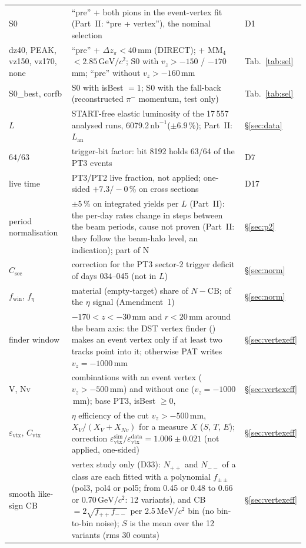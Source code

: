 \documentclass[11pt,a4paper]{article}
\newcommand{\pim}{\ensuremath{\pi^{-}}\xspace}
\newcommand{\nbinv}{\ensuremath{\mathrm{nb}^{-1}}\xspace}
\newcommand{\GeVcc}{\ensuremath{\mathrm{GeV}/c^{2}}\xspace}
\newcommand{\MeVcc}{\ensuremath{\mathrm{MeV}/c^{2}}\xspace}
\newcommand{\code}[1]{\texttt{\detokenize{#1}}}
\newcommand{\MMfour}{\ensuremath{\mathrm{MM}_4}\xspace}
\newcommand{\dzpi}{\ensuremath{\Delta z_\pi}\xspace}
\newcommand{\vz}{\ensuremath{v_z}\xspace}
\newcommand{\Csec}{\ensuremath{C_{\mathrm{sec}}}\xspace}
\newcommand{\feta}{\ensuremath{f_\eta}\xspace}
\newcommand{\fwin}{\ensuremath{f_{\mathrm{win}}}\xspace}
\begin{document}
{\begin{longtable}{@{}>{\raggedright\arraybackslash}p{3.0cm} >{\raggedright\arraybackslash}p{\dimexpr\textwidth-3.0cm-2.0cm-4\tabcolsep\relax} >{\raggedright\arraybackslash}p{2.0cm}@{}}
S0 & ``pre'' + both pions in the event-vertex fit (Part~II: ``pre + vertex''), the nominal selection & D1 \\
dz40, PEAK, vz150, vz170, none & ``pre'' + $\dzpi<40$\,mm (DIRECT); + \MMfour$<2.85$\,\GeVcc; S0 with $\vz>-150$ / $-170$\,mm; ``pre'' without $\vz>-160$\,mm & Tab.~\ref{tab:sel} \\
S0\_best, corfb & S0 with isBest $=1$; S0 with the \code{cor_ok} fall-back (reconstructed \pim momentum, test only) & Tab.~\ref{tab:sel} \\
$L$ & START-free elastic luminosity of the 17\,557 analysed runs, 6079.2\,\nbinv ($\pm6.9$\,\%); Part~II: $L_{\mathrm{an}}$ & \S\ref{sec:data} \\
$64/63$ & trigger-bit factor: bit 8192 holds 63/64 of the PT3 events & D7 \\
live time & PT3/PT2 live fraction, not applied; one-sided $+7.3/-0$\,\% on cross sections & D17 \\
period normalisation & $\pm5$\,\% on integrated yields per $L$ (Part~II): the per-day rates change in steps between the beam periods, cause not proven (Part~II: they follow the beam-halo level, an indication); part of N & \S\ref{sec:p2} \\
\Csec & correction for the PT3 sector-2 trigger deficit of days 034--045 (not in $L$) & \S\ref{sec:norm} \\
\fwin, \feta & material (empty-target) share of $N-\mathrm{CB}$; of the $\eta$ signal (Amendment~1) & \S\ref{sec:norm} \\
finder window & $-170<z<-30$\,mm and $r<20$\,mm around the beam axis: the DST vertex finder (\code{HParticleVertexFind}) makes an event vertex only if at least two tracks point into it; otherwise PAT writes $\vz=-1000$\,mm & \S\ref{sec:vertexeff} \\
V, Nv & combinations with an event vertex ($\vz>-500$\,mm) and without one ($\vz=-1000$\,mm); base PT3, isBest $\ge0$, \code{cor_ok} & \S\ref{sec:vertexeff} \\
$\varepsilon_{\mathrm{vtx}}$, $C_{\mathrm{vtx}}$ & $\eta$ efficiency of the cut $\vz>-500$\,mm, $X_V/(X_V+X_{Nv})$ for a measure $X$ ($S$, $T$, $E$); correction $\varepsilon_{\mathrm{vtx}}^{\mathrm{sim}}/\varepsilon_{\mathrm{vtx}}^{\mathrm{data}}=1.006\pm0.021$ (not applied, one-sided) & \S\ref{sec:vertexeff} \\
smooth like-sign CB & vertex study only (D33): $N_{++}$ and $N_{--}$ of a class are each fitted with a polynomial $f_{\pm\pm}$ (pol3, pol4 or pol5; from 0.45 or 0.48 to 0.66 or 0.70\,\GeVcc: 12 variants), and CB $=2\sqrt{f_{++}f_{--}}$ per 2.5\,\MeVcc bin (no bin-to-bin noise); $S$ is the mean over the 12 variants (rms 30 counts) & \S\ref{sec:vertexeff} \\

\end{longtable}}
\end{document}
